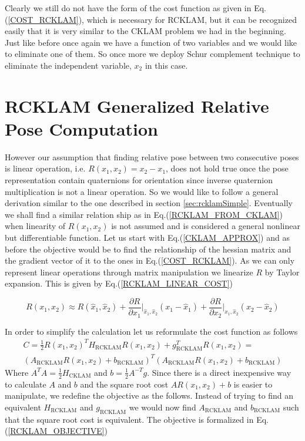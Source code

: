Clearly we still do not have the form of the cost function as given in Eq.(\ref{COST_RCKLAM}), which is necessary for RCKLAM, but it can be recognized easily that it is very similar to the CKLAM problem we had in the beginning. Just like before once again we have a function of two variables and we would like to eliminate one of them. So once more we deploy Schur complement technique to eliminate the independent variable, $x_2$ in this case.

\section{RCKLAM Generalized Relative Pose Computation}
\label{RCKLAMGeneralizedFormulation}
However our assumption that finding relative pose between two consecutive poses is linear operation, i.e. $R(x_1, x_2) = x_2 - x_1$, does not hold true once the pose representation contain quaternions for orientation since inverse quaternion multiplication is not a linear operation. So we would like to follow a general derivation similar to the one described in section \ref{sec:rcklamSimple}. Eventually we shall find a similar relation ship as in Eq.(\ref{RCKLAM_FROM_CKLAM}) when linearity of $R(x_1, x_2)$ is not assumed and is considered a general nonlinear but differentiable function. Let us start with Eq.(\ref{CKLAM_APPROX}) and as before the objective would be to find the relationship of the hessian matrix and the gradient vector of it to the ones in Eq.(\ref{COST_RCKLAM}). As we can only represent linear operations through matrix manipulation we linearize $R$ by Taylor expansion. This is given by Eq.(\ref{RCKLAM_LINEAR_COST})

\begin{equation}
  R(x_1, x_2) \approx R(\hat x_1, \hat x_2) + \frac{\partial R} {\partial x_1}\biggr\rvert_{\hat x_1, \hat x_2} (x_1 - \hat x_1)+ \frac{\partial R} {\partial x_2}\biggr\rvert_{\hat x_1, \hat x_2} (x_2 - \hat x_2)
	\label{RCKLAM_LINEAR_COST}
\end{equation}

In order to simplify the calculation let us reformulate the cost function as follows
\begin{equation}
  \begin{split}
    C = \frac{1}{2}R(x_1, x_2)^TH_\mathrm{RCKLAM}R(x_1, x_2) + g_\mathrm{RCKLAM}^TR(x_1, x_2) = \\ (A_\mathrm{RCKLAM}R(x_1, x_2) + b_\mathrm{RCKLAM})^T(A_\mathrm{RCKLAM}R(x_1, x_2) + b_\mathrm{RCKLAM})
    \label{COST_RCKLAM_FACTORIZED}
    \end{split}
\end{equation}
 Where $A^TA = \frac{1}{2}H_\mathrm{CKLAM}$ and $b = \frac{1}{2} A^{-T}g$. Since there is a direct inexpensive way to calculate $A$ and $b$ and the square root cost $AR(x_1, x_2) + b$ is easier to manipulate, we redefine the objective as the follows. Instead of trying to find an equivalent $H_\mathrm{RCKLAM}$ and $g_\mathrm{RCKLAM}$ we would now find $A_\mathrm{RCKLAM}$ and $b_\mathrm{RCKLAM}$ such that the square root cost is equivalent. The objective is formalized in Eq.(\ref{RCKLAM_OBJECTIVE})

